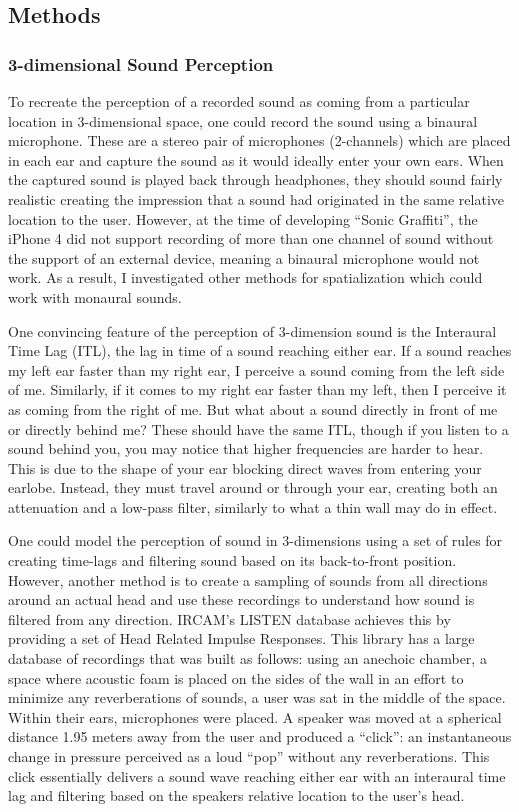 \documentclass[a4paper,10pt,final]{ThesisStyle}
\begin{document}
\subsection{Methods}

\subsubsection{3-dimensional Sound Perception}\label{sec:binauralization}
To recreate the perception of a recorded sound as coming from a particular location in 3-dimensional space, one could record the sound using a binaural microphone.  These are a stereo pair of microphones (2-channels) which are placed in each ear and capture the sound as it would ideally enter your own ears.  When the captured sound is played back through headphones, they should sound fairly realistic creating the impression that a sound had originated in the same relative location to the user.  However, at the time of developing ``Sonic Graffiti'', the iPhone 4 did not support recording of more than one channel of sound without the support of an external device, meaning a binaural microphone would not work.  As a result, I investigated other methods for spatialization which could work with monaural sounds.

One convincing feature of the perception of 3-dimension sound is the Interaural Time Lag (ITL), the lag in time of a sound reaching either ear.  If a sound reaches my left ear faster than my right ear, I perceive a sound coming from the left side of me.  Similarly, if it comes to my right ear faster than my left, then I perceive it as coming from the right of me.  But what about a sound directly in front of me or directly behind me?  These should have the same ITL, though if you listen to a sound behind you, you may notice that higher frequencies are harder to hear.  This is due to the shape of your ear blocking direct waves from entering your earlobe.  Instead, they must travel around or through your ear, creating both an attenuation and a low-pass filter, similarly to what a thin wall may do in effect.  

One could model the perception of sound in 3-dimensions using a set of rules for creating time-lags and filtering sound based on its back-to-front position.  However, another method is to create a sampling of sounds from all directions around an actual head and use these recordings to understand how sound is filtered from any direction.  IRCAM's LISTEN database achieves this by providing a set of Head Related Impulse Responses.  This library has a large database of recordings that was built as follows: using an anechoic chamber, a space where acoustic foam is placed on the sides of the wall in an effort to minimize any reverberations of sounds, a user was sat in the middle of the space.  Within their ears, microphones were placed.  A speaker was moved at a spherical distance 1.95 meters away from the user and produced a ``click'': an instantaneous change in pressure perceived as a loud ``pop'' without any reverberations.  This click essentially delivers a sound wave reaching either ear with an interaural time lag and filtering based on the speakers relative location to the user's head.  
\end{document}
